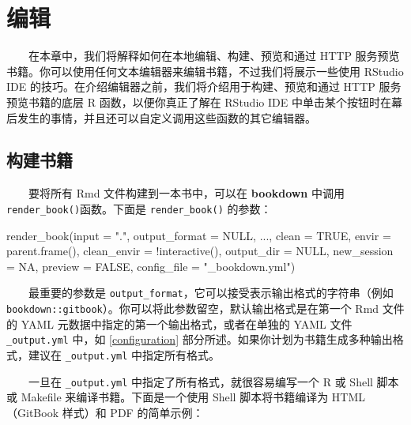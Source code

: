 \documentclass[
  12pt,
]{krantz}
\newenvironment{Shaded}{\begin{snugshade}}{\end{snugshade}}
\newcommand{\AttributeTok}[1]{\textcolor[rgb]{0.77,0.63,0.00}{#1}}
\newcommand{\ConstantTok}[1]{\textcolor[rgb]{0.00,0.00,0.00}{#1}}
\newcommand{\FunctionTok}[1]{\textcolor[rgb]{0.00,0.00,0.00}{#1}}
\newcommand{\NormalTok}[1]{#1}
\newcommand{\SpecialCharTok}[1]{\textcolor[rgb]{0.00,0.00,0.00}{#1}}
\newcommand{\StringTok}[1]{\textcolor[rgb]{0.31,0.60,0.02}{#1}}
\theoremstyle{definition}
\theoremstyle{definition}
\theoremstyle{definition}
\theoremstyle{definition}
\theoremstyle{remark}
\begin{document}
\hypertarget{editing}{%
\chapter{编辑}\label{editing}}

  在本章中，我们将解释如何在本地编辑、构建、预览和通过 HTTP 服务预览书籍。你可以使用任何文本编辑器来编辑书籍，不过我们将展示一些使用 RStudio IDE 的技巧。在介绍编辑器之前，我们将介绍用于构建、预览和通过 HTTP 服务预览书籍的底层 R 函数，以便你真正了解在 RStudio IDE 中单击某个按钮时在幕后发生的事情，并且还可以自定义调用这些函数的其它编辑器。

\hypertarget{build-the-book}{%
\section{构建书籍}\label{build-the-book}}

  要将所有 Rmd 文件构建到一本书中，可以在 \textbf{bookdown} 中调用 \texttt{render\_book()}函数。下面是 \texttt{render\_book()} 的参数：

\begin{Shaded}
\begin{Highlighting}[]
\FunctionTok{render\_book}\NormalTok{(}\AttributeTok{input =} \StringTok{"."}\NormalTok{, }\AttributeTok{output\_format =} \ConstantTok{NULL}\NormalTok{, ...,}
  \AttributeTok{clean =} \ConstantTok{TRUE}\NormalTok{, }\AttributeTok{envir =} \FunctionTok{parent.frame}\NormalTok{(),}
  \AttributeTok{clean\_envir =} \SpecialCharTok{!}\FunctionTok{interactive}\NormalTok{(), }\AttributeTok{output\_dir =} \ConstantTok{NULL}\NormalTok{,}
  \AttributeTok{new\_session =} \ConstantTok{NA}\NormalTok{, }\AttributeTok{preview =} \ConstantTok{FALSE}\NormalTok{,}
  \AttributeTok{config\_file =} \StringTok{"\_bookdown.yml"}\NormalTok{)}
\end{Highlighting}
\end{Shaded}

  最重要的参数是 \texttt{output\_format}，它可以接受表示输出格式的字符串（例如 \texttt{\textquotesingle{}bookdown::gitbook\textquotesingle{}}）。你可以将此参数留空，默认输出格式是在第一个 Rmd 文件的 YAML 元数据中指定的第一个输出格式，或者在单独的 YAML 文件 \texttt{\_output.yml} 中，如 \ref{configuration} 部分所述。如果你计划为书籍生成多种输出格式，建议在 \texttt{\_output.yml} 中指定所有格式。

  一旦在 \texttt{\_output.yml} 中指定了所有格式，就很容易编写一个 R 或 Shell 脚本或 Makefile 来编译书籍。下面是一个使用 Shell 脚本将书籍编译为 HTML（GitBook 样式）和 PDF 的简单示例：
\end{document}
